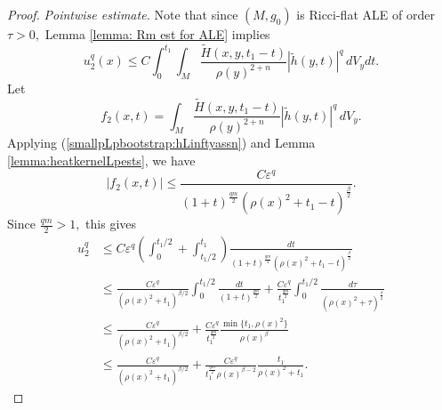 \documentclass[12pt]{amsart}
\renewcommand{\1}{{\mathbf 1}}
\newcommand{\eps}{{\varepsilon}}
\theoremstyle{others}
\numberwithin{equation}{section}
\begin{document}
\begin{proof}
        \emph{Pointwise estimate.}  Note that since $(M,g_0)$ is Ricci-flat ALE of order $\tau > 0,$ Lemma \ref{lemma: Rm est for ALE} implies
    \begin{equation*}
        u^q_2(x) \leq C \int_0^{t_1} \!\!\!\! \int_M \frac{\tilde{H}(x,y,t_1 - t)}{ \rho(y)^{2 + n} } |\tilde{h}(y,t)|^q \, dV_y dt.
    \end{equation*}
     Let
     $$f_2(x,t) = \int_M \frac{\tilde{H}(x,y,t_1 - t) }{ \rho(y)^{2 + n} } |\tilde{h}(y,t)|^q \, dV_y.$$
Applying (\ref{smallpLpbootstrap:hLinftyassn}) and Lemma \ref{lemma:heatkernelLpests}, we have
$$|f_2(x,t)| \leq \frac{C \eps^q }{(1 + t)^{\frac{qm}{2}} \left( \rho(x)^2 + t_1 - t \right)^{\frac{\beta}{2}} }.$$
Since $\frac{qm}{2} > 1,$ this gives
\begin{equation}
\begin{split}
    u_2^q 
    & \leq C\eps^q \left( \int_0^{t_1/2} + \int_{t_1/2}^{t_1}\right)\frac{dt}{(1 + t)^{\frac{qm}{2}} \left( \rho(x)^2 + t_1 - t \right)^{\frac{\beta}{2}} } \\
    & \leq \frac{C\eps^q }{ \left( \rho(x)^2 + t_1 \right)^{\beta/2}} \int_0^{t_1/2} \frac{dt}{(1 + t)^{\frac{qm}{2}}} + \frac{C \eps^q }{t_1^{\frac{qm}{2}}} \int_{0}^{t_1/2} \frac{d\tau}{\left( \rho(x)^2 + \tau \right)^{\frac{\beta}{2}} } \\
    & \leq \frac{C\eps^q}{ \left( \rho(x)^2 + t_1 \right)^{\beta/2}}  + \frac{C \eps^q}{t_1^{\frac{qm}{2}}} \frac{\min\{ t_1, \rho(x)^2 \}}{\rho(x)^\beta} \\
    & \leq \frac{C\eps^q}{ \left( \rho(x)^2 + t_1 \right)^{\beta/2}}  + \frac{C \eps^q}{t_1^{\frac{qm}{2}} \rho(x)^{\beta - 2}} \frac{t_1}{\rho(x)^2 + t_1}.
    \end{split}
\end{equation}


\end{proof}
\end{document}
